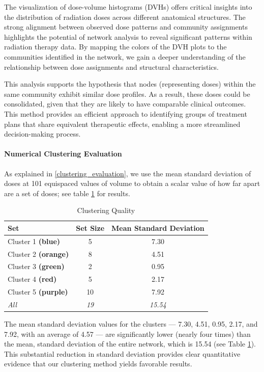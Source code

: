 The visualization of dose-volume histograms (DVHs) offers critical insights into the distribution of radiation doses across different anatomical structures.
The strong alignment between observed dose patterns and community assignments highlights the potential of network analysis to reveal significant patterns within radiation therapy data.
By mapping the colors of the DVH plots to the communities identified in the network, we gain a deeper understanding of the relationship between dose assignments and structural characteristics.

This analysis supports the hypothesis that nodes (representing doses) within the same community exhibit similar dose profiles.
As a result, these doses could be consolidated, given that they are likely to have comparable clinical outcomes.
This method provides an efficient approach to identifying groups of treatment plans that share equivalent therapeutic effects, enabling a more streamlined decision-making process.

\paragraph{Numerical Clustering Evaluation}
As explained in \ref{clustering_evaluation}, we use the mean standard deviation of doses at 101 equispaced values of volume to obtain a scalar value of how far apart are a set of doses; see table \ref{table:cluster_std} for results.

\begin{table}
	\centering
	\begin{tabular}{|l|c|c|}
		\hline
		Set & Set Size & Mean Standard Deviation \\
		\hline
		Cluster 1 \textcolor{plt-blue}  {\textbf{(blue)}}   & 5  & 7.30 \\
		Cluster 2 \textcolor{plt-orange}{\textbf{(orange)}} & 8  & 4.51 \\
		Cluster 3 \textcolor{plt-green} {\textbf{(green)}}  & 2  & 0.95 \\
		Cluster 4 \textcolor{plt-red}   {\textbf{(red)}}    & 5  & 2.17 \\
		Cluster 5 \textcolor{plt-purple}{\textbf{(purple)}} & 10 & 7.92 \\
		\textit{All} & \textit{19} & \textit{15.54} \\
		\hline
	\end{tabular}
	\caption{Clustering Quality}
	\label{table:cluster_std}
\end{table}

The mean standard deviation values for the clusters — 7.30, 4.51, 0.95, 2.17, and 7.92, with an average of 4.57 — are significantly lower (nearly four times) than the mean, standard deviation of the entire network, which is 15.54 (see Table \ref{table:cluster_std}).
This substantial reduction in standard deviation provides clear quantitative evidence that our clustering method yields favorable results. 

